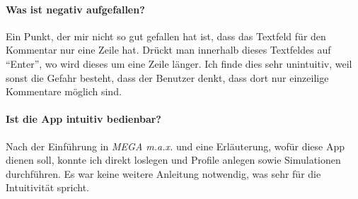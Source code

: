 	\paragraph{Was ist negativ aufgefallen?}
	
		Ein Punkt, der mir nicht so gut gefallen hat ist, dass das Textfeld für den Kommentar nur eine Zeile hat. Drückt man innerhalb dieses Textfeldes auf ``Enter'', wo wird dieses um eine Zeile länger. Ich finde dies sehr unintuitiv, weil sonst die Gefahr besteht, dass der Benutzer denkt, dass dort nur einzeilige Kommentare möglich sind.
	
	\paragraph{Ist die App intuitiv bedienbar?}
	
		Nach der Einführung in \textit{MEGA m.a.x.} und eine Erläuterung, wofür diese App dienen soll, konnte ich direkt loslegen und Profile anlegen sowie Simulationen durchführen. Es war keine weitere Anleitung notwendig, was sehr für die Intuitivität spricht. 
	
